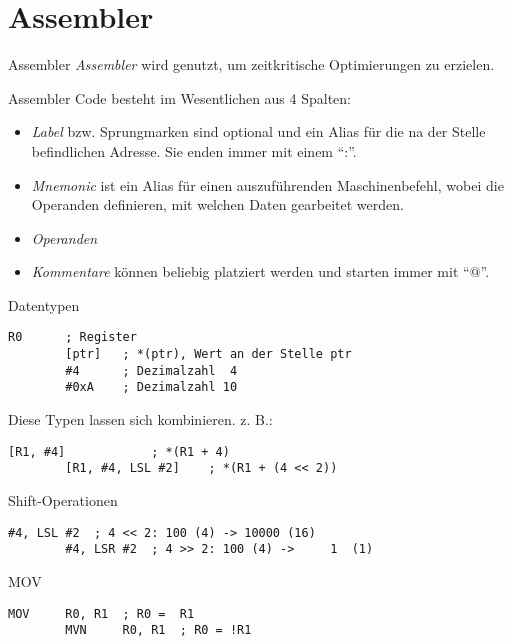 \section{Assembler}

\begin{defi}{Assembler}
    \emph{Assembler} wird genutzt, um zeitkritische Optimierungen zu erzielen.

    Assembler Code besteht im Wesentlichen aus 4 Spalten:
    \begin{itemize}
        \item \emph{Label} bzw. Sprungmarken sind optional und ein Alias für die na der Stelle befindlichen Adresse.
              Sie enden immer mit einem \enquote{:}.
        \item \emph{Mnemonic} ist ein Alias für einen auszuführenden Maschinenbefehl, wobei die Operanden definieren, mit welchen Daten gearbeitet werden.
        \item \emph{Operanden}
        \item \emph{Kommentare} können beliebig platziert werden und starten immer mit \enquote{@}.
    \end{itemize}
\end{defi}

\begin{defi}{Datentypen}
    \begin{lstlisting}[language={[x86masm]Assembler}]
        R0      ; Register
        [ptr]   ; *(ptr), Wert an der Stelle ptr
        #4      ; Dezimalzahl  4
        #0xA    ; Dezimalzahl 10
    \end{lstlisting}

    Diese Typen lassen sich kombinieren.
    z. B.:
    \begin{lstlisting}[language={[x86masm]Assembler}]
        [R1, #4]            ; *(R1 + 4)
        [R1, #4, LSL #2]    ; *(R1 + (4 << 2))
    \end{lstlisting}
\end{defi}

\begin{defi}{Shift-Operationen}
    \begin{lstlisting}[language={[x86masm]Assembler}]
        #4, LSL #2  ; 4 << 2: 100 (4) -> 10000 (16)
        #4, LSR #2  ; 4 >> 2: 100 (4) ->     1  (1)
    \end{lstlisting}
\end{defi}

\begin{defi}{MOV}
    \begin{lstlisting}[language={[x86masm]Assembler}]
        MOV     R0, R1  ; R0 =  R1
        MVN     R0, R1  ; R0 = !R1
    \end{lstlisting}
\end{defi}

